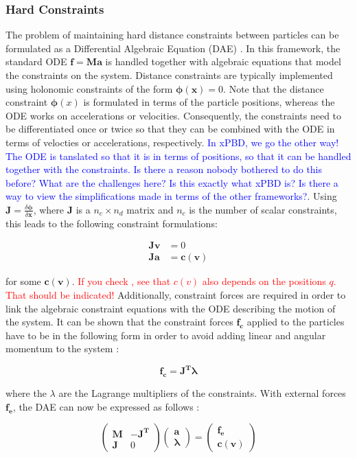 \documentclass{article}
\begin{document}
\subsubsection*{Hard Constraints}
The problem of maintaining hard distance constraints between particles can be formulated as a Differential Algebraic Equation (DAE)
\cite{ascher1995, baraff1996}. In this framework, the standard ODE $\bm{f} = \bm{Ma}$ is handled together with algebraic equations 
that model the constraints on the system. Distance constraints are typically implemented using holonomic constraints of the form 
$\bm{\phi(x)} = 0$. Note that the distance constraint $\bm{\phi}(x)$ is formulated in terms of the particle positions, whereas the ODE
works on accelerations or velocities. Consequently, the constraints need to be differentiated once or twice so that they can be 
combined with the ODE in terms of velocties or accelerations, respectively. \textcolor{blue}{In xPBD, we go the other way! The ODE
is tanslated so that it is in terms of positions, so that it can be handled together with the constraints. Is there a reason nobody bothered to
do this before? What are the challenges here? Is this exactly what xPBD is? Is there a way to view the simplifications made in 
terms of the other frameworks?}. Using $\bm{J} = \frac{\delta \bm{\phi}}{\delta \bm{x}}$, where $\bm{J}$ is a $n_c \times n_d$ matrix
and $n_c$ is the number of scalar constraints, this leads to the following constraint formulations:

\begin{align*}
    \bm{Jv} &= 0 \\
    \bm{Ja} &= \bm{c(v)}
\end{align*}

for some $\bm{c(v)}$. \textcolor{red}{If you check \cite{ascher1995}, see that $c(v)$ also depends on the positions $q$. That should be indicated!} 
Additionally, constraint forces are required in order to link the algebraic constraint equations with the ODE describing the motion of 
the system. It can be shown that the constraint forces $\bm{f_c}$ applied to the particles have to be in the following form in order to 
avoid adding linear and angular momentum to the system \cite{baraff1996}:

\[
    \bm{f_c} = \bm{J^T \lambda}
\]

where the $\lambda$ are the Lagrange multipliers of the constraints. With external forces $\bm{f_e}$, the DAE can now be expressed as follows 
\cite{ascher1995}:

\[
    \begin{pmatrix}
        \bm{M} & \bm{-J^T} \\
        \bm{J} & 0
    \end{pmatrix}
    \begin{pmatrix}
        \bm{a} \\
        \bm{\lambda}
    \end{pmatrix}
    =
    \begin{pmatrix}
        \bm{f_e} \\
        \bm{c(v)}
    \end{pmatrix}
\]
\end{document}
